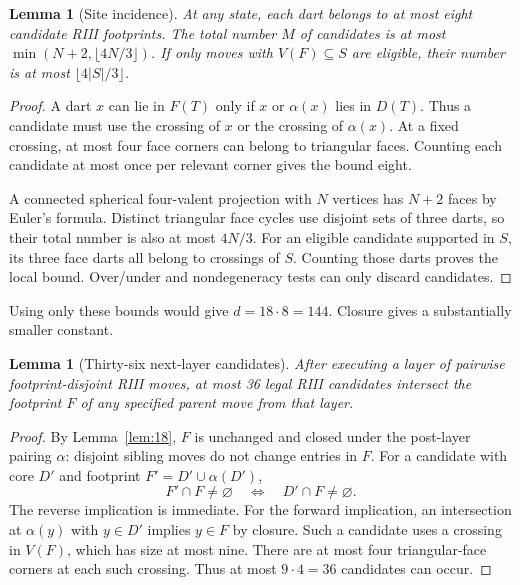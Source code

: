 \documentclass[11pt]{article}
\newtheorem{lemma}[theorem]{Lemma}
\theoremstyle{definition}
\begin{document}
\begin{lemma}[Site incidence]
\label{lem:incidence}
At any state, each dart belongs to at most eight candidate RIII
footprints. The total number $M$ of candidates is at most
$\min(N+2,\lfloor4N/3\rfloor)$. If only moves with $V(F)\subseteq S$
are eligible, their number is at most $\lfloor4|S|/3\rfloor$.
\end{lemma}

\begin{proof}
A dart $x$ can lie in $F(T)$ only if $x$ or $\alpha(x)$ lies in $D(T)$.
Thus a candidate must use the crossing of $x$ or the crossing of
$\alpha(x)$. At a fixed crossing, at most four face corners can belong
to triangular faces. Counting each candidate at most once per relevant
corner gives the bound eight.

A connected spherical four-valent projection with $N$ vertices has $N+2$
faces by Euler's formula. Distinct triangular face cycles use disjoint
sets of three darts, so their total number is also at most $4N/3$.
For an eligible candidate supported in $S$, its three face darts all
belong to crossings of $S$. Counting those darts proves the local bound.
Over/under and nondegeneracy tests can only discard candidates.
\end{proof}

Using only these bounds would give $d=18\cdot8=144$. Closure gives a
substantially smaller constant.

\begin{lemma}[Thirty-six next-layer candidates]
\label{lem:36}
After executing a layer of pairwise footprint-disjoint RIII moves, at
most 36 legal RIII candidates intersect the footprint $F$ of any
specified parent move from that layer.
\end{lemma}

\begin{proof}
By Lemma~\ref{lem:18}, $F$ is unchanged and closed under the post-layer
pairing $\alpha$: disjoint sibling moves do not change entries in $F$.
For a candidate with core $D'$ and footprint $F'=D'\cup\alpha(D')$,
\[
 F'\cap F\ne\varnothing\quad\Longleftrightarrow\quad D'\cap F\ne\varnothing.
\]
The reverse implication is immediate. For the forward implication, an
intersection at $\alpha(y)$ with $y\in D'$ implies $y\in F$ by closure.
Such a candidate uses a crossing in $V(F)$, which has size at most nine.
There are at most four triangular-face corners at each such crossing.
Thus at most $9\cdot4=36$ candidates can occur.
\end{proof}
\end{document}
